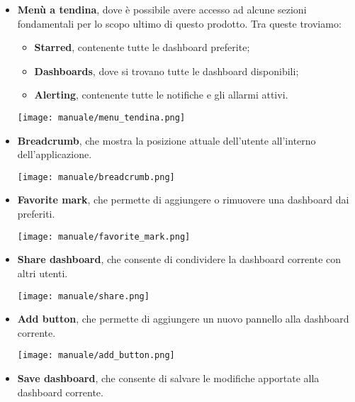 \begin{itemize}
    \item \textbf{Menù a tendina}, dove è possibile avere accesso ad alcune sezioni fondamentali per lo scopo ultimo di questo prodotto. Tra queste troviamo:
        \begin{itemize}
            \item \textbf{Starred}, contenente tutte le dashboard preferite;
            \item \textbf{Dashboards}, dove si trovano tutte le dashboard disponibili;
            \item \textbf{Alerting}, contenente tutte le notifiche e gli allarmi attivi.
        \end{itemize}
        \begin{center}
            \texttt{[image: manuale/menu\_tendina.png]}
        \end{center}
    \item \textbf{Breadcrumb}, che mostra la posizione attuale dell'utente all'interno dell'applicazione.
        \begin{center}
            \texttt{[image: manuale/breadcrumb.png]}
        \end{center}
    \item \textbf{Favorite mark}, che permette di aggiungere o rimuovere una dashboard dai preferiti.
        \begin{center}
            \texttt{[image: manuale/favorite\_mark.png]}
        \end{center}
    \item \textbf{Share dashboard}, che consente di condividere la dashboard corrente con altri utenti.
        \begin{center}
            \texttt{[image: manuale/share.png]}
        \end{center}
    \item \textbf{Add button}, che permette di aggiungere un nuovo pannello alla dashboard corrente.
        \begin{center}
            \texttt{[image: manuale/add\_button.png]}
        \end{center}
    \item \textbf{Save dashboard}, che consente di salvare le modifiche apportate alla dashboard corrente.

\end{itemize}
